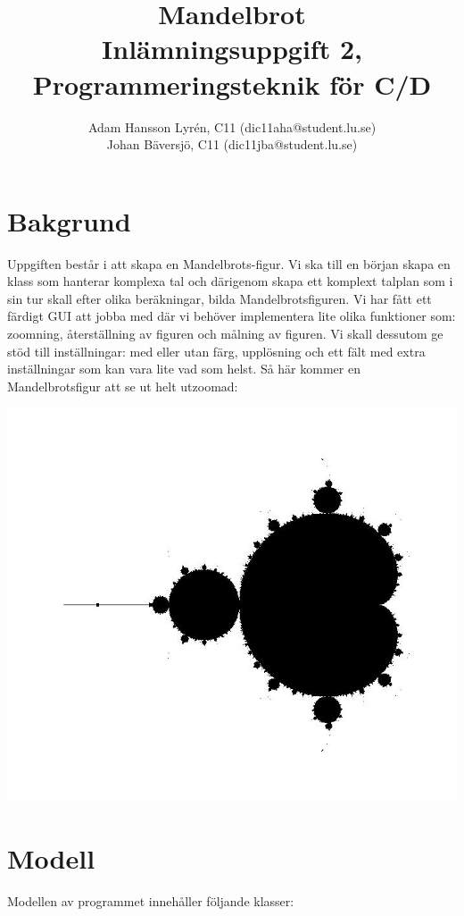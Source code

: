 \documentclass[a4paper]{article}
\title{Mandelbrot \\
	Inlämningsuppgift 2, Programmeringsteknik för C/D}
\author{Adam Hansson Lyrén, C11 (dic11aha@student.lu.se)\\
Johan Bäversjö, C11 (dic11jba@student.lu.se)}
\begin{document}

\maketitle
\thispagestyle{empty}
\newpage
\setcounter{page}{1}
\section{Bakgrund}
Uppgiften består i att skapa en Mandelbrots-figur. Vi ska till en början skapa en klass som hanterar komplexa tal och därigenom skapa ett komplext talplan som i sin tur skall efter olika beräkningar, bilda Mandelbrotsfiguren. Vi har fått ett färdigt GUI att jobba med där vi behöver implementera lite olika funktioner som: zoomning, återställning av figuren och målning av figuren.
\newline
Vi skall dessutom ge stöd till inställningar: med eller utan färg, upplösning och ett fält med extra inställningar som kan vara lite vad som helst.
\newline
\newline
Så här kommer en Mandelbrotsfigur att se ut helt utzoomad:
\begin{center}
\includegraphics[scale=0.29]{mandelbrot_print_1.jpg}
\end{center}
 
\section{Modell}
Modellen av programmet innehåller följande klasser:
\end{document}
